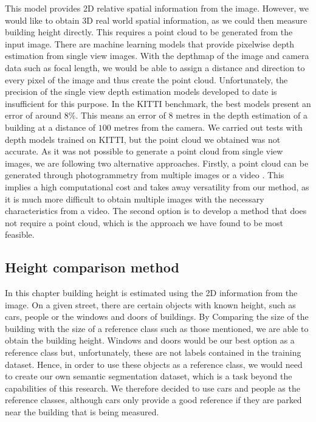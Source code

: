 \documentclass[journal,article,submit,pdftex,moreauthors]{Definitions/mdpi}
\begin{document}
This model provides 2D relative spatial information from the image. However, we would like to obtain 3D real world spatial information, as we could then measure building height directly. This requires a point cloud to be generated from the input image. There are machine learning models that provide pixelwise depth estimation from single view images. With the depthmap of the image and camera data such as focal length, we would be able to assign a distance and direction to every pixel of the image and thus create the point cloud. Unfortunately, the precision of the single view depth estimation models \cite{LiBinsFormer:Estimation} developed to date is insufficient for this purpose. In the KITTI benchmark, the best models present an error of around \(8\%\). This means an error of \(8\) metres in the depth estimation of a building at a distance of \(100\) metres from the camera. We carried out tests with depth models trained on KITTI, but the point cloud we obtained was not accurate. As it was not possible to generate a point cloud from single view images, we are following two alternative approaches. Firstly, a point cloud can be generated through photogrammetry from multiple images or a video \cite{Muller2022InstantEncoding}. This implies a high computational cost and takes away versatility from our method, as it is much more difficult to obtain multiple images with the necessary characteristics from a video. The second option is to develop a method that does not require a point cloud, which is the approach we have found to be most feasible.

\subsection{Height comparison method}

In this chapter building height is estimated using the 2D information from the image. On a given street, there are certain objects with known height, such as cars, people or the windows and doors of buildings. By Comparing the size of the building with the size of a reference class such as those mentioned, we are able to obtain the building height. Windows and doors would be our best option as a reference class but, unfortunately, these are not labels contained in the training dataset.  Hence, in order to use these objects as a reference class, we would need to create our own semantic segmentation dataset, which is a task beyond the capabilities of this research. We therefore decided to use cars and people as the reference classes, although cars only provide a good reference if they are parked near the building that is being measured. 
\end{document}
